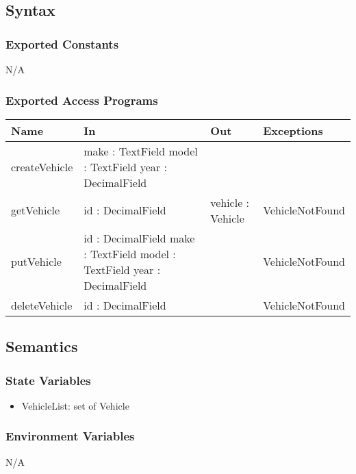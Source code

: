 \documentclass[12pt, titlepage]{article}
\begin{document}
    \subsection{Syntax}
        \subsubsection{Exported Constants}
            N/A
        \subsubsection{Exported Access Programs}
            \begin{center}
                \begin{tabular}{p{2.5cm} p{4cm} p{4cm} p{3cm}}
                    \toprule
                    \textbf{Name} & \textbf{In} & \textbf{Out} & \textbf{Exceptions} \\
                    \midrule
                    createVehicle & make : TextField \newline model : TextField \newline year : DecimalField & & \\ \hline
                    getVehicle & id : DecimalField & vehicle : Vehicle & VehicleNotFound \\ \hline
                    putVehicle & id : DecimalField \newline make : TextField \newline model : TextField \newline year : DecimalField & & VehicleNotFound \\ \hline
                    deleteVehicle & id : DecimalField & & VehicleNotFound \\
                    \bottomrule
                \end{tabular}
            \end{center}
    \subsection{Semantics}
        \subsubsection{State Variables}
            \begin{itemize}
                \item VehicleList: set of Vehicle
            \end{itemize}
        \subsubsection{Environment Variables}
            N/A
\end{document}
